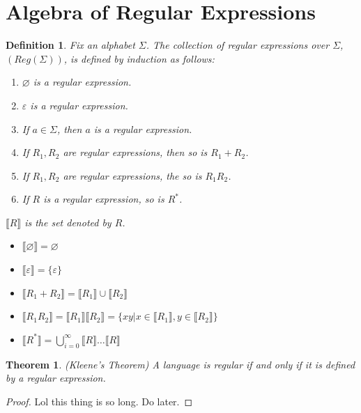 \documentclass{article}
\newtheorem{theorem}{Theorem}
\newtheorem{definition}{Definition}
\begin{document}
\section{Algebra of Regular Expressions}
\begin{definition}
Fix an alphabet $\Sigma$. The collection of regular expressions over $\Sigma$, $(Reg(\Sigma))$, is defined by induction as follows:
\begin{enumerate}
    \item $\varnothing$ is a regular expression.
    \item $\varepsilon$ is a regular expression.
    \item If $a \in \Sigma$, then $a$ is a regular expression.
    \item If $R_1,R_2$ are regular expressions, then so is $R_1 + R_2$.
    \item If $R_1, R_2$ are regular expressions, the so is $R_1R_2$.
    \item If $R$ is a regular expression, so is $R^*$.
\end{enumerate}
$\llbracket R \rrbracket$ is the set denoted by $R$.
\begin{itemize}
    \item $\llbracket \varnothing \rrbracket = \varnothing$
    \item $\llbracket \varepsilon \rrbracket = \{\varepsilon\}$
    \item $\llbracket R_1 + R_2 \rrbracket = \llbracket R_1 \rrbracket \cup \llbracket R_2 \rrbracket$
    \item $\llbracket R_1R_2 \rrbracket = \llbracket R_1 \rrbracket\llbracket R_2 \rrbracket = \{xy | x \in \llbracket R_1 \rrbracket, y\in \llbracket R_2 \rrbracket\}$
    \item $\llbracket R^* \rrbracket = \bigcup_{i=0}^{\infty}\llbracket R \rrbracket \ldots \llbracket R \rrbracket$
\end{itemize}
\end{definition}
\begin{theorem}
(Kleene's Theorem)
A language is regular if and only if it is defined by a regular expression.
\end{theorem}
\begin{proof}
Lol this thing is so long. Do later.
\end{proof}
\end{document}
